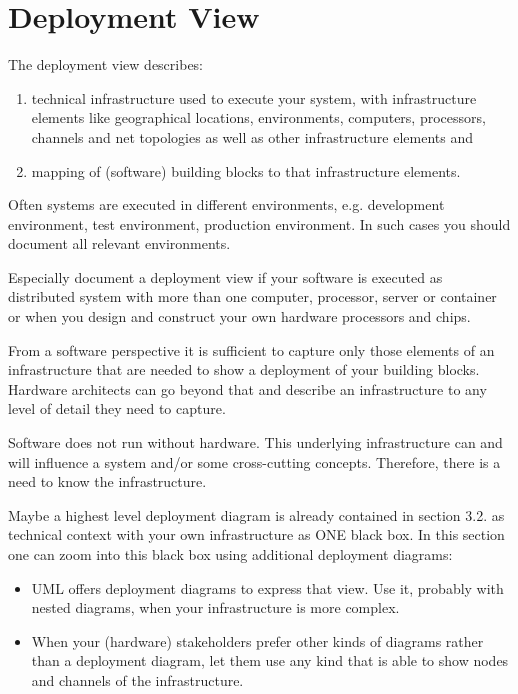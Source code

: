\section{Deployment View}

The deployment view describes:
\begin{enumerate}
  \item technical infrastructure used to execute your system, with infrastructure elements like geographical locations, environments, computers, processors, channels and net topologies as well as other infrastructure elements and
  \item mapping of (software) building blocks to that infrastructure elements.
\end{enumerate}

Often systems are executed in different environments, e.g. development environment, test environment, production environment. In such cases you should document all relevant environments.

Especially document a deployment view if your software is executed as distributed system with more than one computer, processor, server or container or when you design and construct your own hardware processors and chips.

From a software perspective it is sufficient to capture only those elements of an infrastructure that are needed to show a deployment of your building blocks. Hardware architects can go beyond that and describe an infrastructure to any level of detail they need to capture.

Software does not run without hardware. This underlying infrastructure can and will influence a system and/or some cross-cutting concepts. Therefore, there is a need to know the infrastructure.

Maybe a highest level deployment diagram is already contained in section 3.2. as technical context with your own infrastructure as ONE black box. In this section one can zoom into this black box using additional deployment diagrams:
\begin{itemize}
  \item UML offers deployment diagrams to express that view. Use it, probably with nested diagrams, when your infrastructure is more complex.
  \item When your (hardware) stakeholders prefer other kinds of diagrams rather than a deployment diagram, let them use any kind that is able to show nodes and channels of the infrastructure.
\end{itemize}

